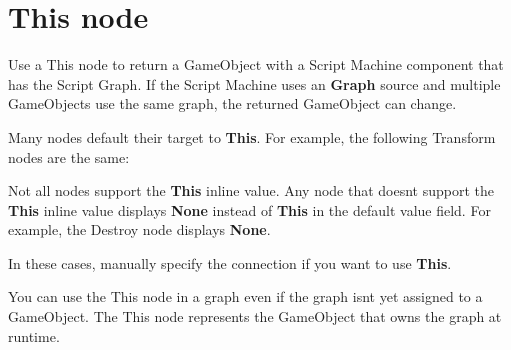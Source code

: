 \chapter{This node}
\hypertarget{md__library_2_package_cache_2com_8unity_8visualscripting_0d1_89_82_2_documentation_0i_2vs-self}{}\label{md__library_2_package_cache_2com_8unity_8visualscripting_0d1_89_82_2_documentation_0i_2vs-self}
\label{md__library_2_package_cache_2com_8unity_8visualscripting_0d1_89_82_2_documentation_0i_2vs-self_autotoc_md2086}%
%
 Use a This node to return a Game\+Object with a Script Machine component that has the Script Graph. If the Script Machine uses an {\bfseries{Graph}} source and multiple Game\+Objects use the same graph, the returned Game\+Object can change. ~\newline


Many nodes default their target to {\bfseries{This}}. For example, the following Transform nodes are the same\+:



Not all nodes support the {\bfseries{This}} inline value. Any node that doesn\textquotesingle{}t support the {\bfseries{This}} inline value displays {\bfseries{None}} instead of {\bfseries{This}} in the default value field. For example, the Destroy node displays {\bfseries{None}}.

In these cases, manually specify the connection if you want to use {\bfseries{This}}.



You can use the This node in a graph even if the graph isn\textquotesingle{}t yet assigned to a Game\+Object. The This node represents the Game\+Object that owns the graph at runtime. 